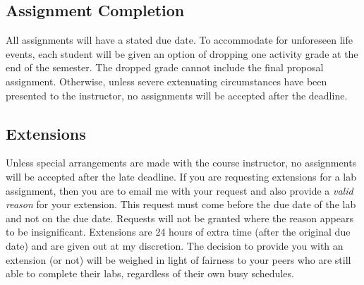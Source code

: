 \documentclass[11pt]{article} %
\begin{document}
\vspace{-.1in}
\subsection*{\textbf{Assignment Completion}}

All assignments will have a stated due date. To accommodate for unforeseen life events, each student will be given an option of dropping one activity grade at the end of the semester. The dropped grade cannot include the final proposal assignment. Otherwise, unless severe extenuating circumstances have been presented to the instructor, no assignments will be accepted after the deadline.




\vspace{-.10in}
\subsection*{\textbf{Extensions}}
Unless special arrangements are made with the course instructor, no assignments will be accepted after the late deadline. If you are requesting extensions for a lab assignment, then you are to email me with your request and also provide a \emph{valid reason} for your extension. This request must come before the due date of the lab and not on the due date. Requests will not be granted where the reason appears to be insignificant. Extensions are 24 hours of extra time (after the original due date) and are given out at my discretion. The decision to provide you with an extension (or not) will be weighed in light of fairness to your peers who are still able to complete their labs, regardless of their own busy schedules. 
\end{document}
